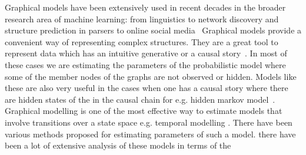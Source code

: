 Graphical models have been extensively used in recent decades in the
broader research area of machine learning: from linguistics to network discovery and
structure prediction in parsers to online social media~\cite{Koller+Friedman:09}
Graphical models provide a convenient way of  representing complex structures.
They are a great tool to represent data which has an intuitive generative
or a causal story~\cite{GettingStarted}. In most of these cases we are
estimating the parameters of the probabilistic model where some of the member
nodes of the graphs are not observed or hidden. Models like these are also very
useful in the cases when one has a causal story where there are hidden states of
the in the causal chain for e.g. hidden markov model~\cite{Baum1967}. Graphical
modelling is one of the most effective way to estimate models that involve
transitions over a state space e.g. temporal modelling
\cite{Arnold:2007:TCM:1281192.1281203}. There have been various methods
proposed for estimating parameters of such a model. 
there have been a lot of extensive analysis of these models in terms of the
